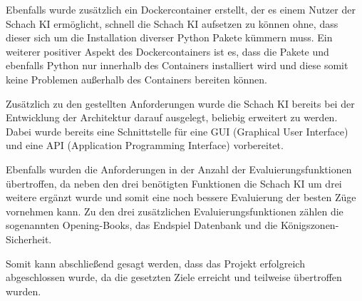 Ebenfalls wurde zusätzlich ein Dockercontainer erstellt, der es einem Nutzer der Schach KI ermöglicht, schnell die Schach KI aufsetzen zu können ohne, dass dieser sich um die Installation diverser Python Pakete kümmern muss. Ein weiterer positiver Aspekt des Dockercontainers ist es, dass die Pakete und ebenfalls Python nur innerhalb des Containers installiert wird und diese somit keine Problemen außerhalb des Containers bereiten können.

Zusätzlich zu den gestellten Anforderungen wurde die Schach KI bereits bei der Entwicklung der Architektur darauf ausgelegt, beliebig erweitert zu werden. Dabei wurde bereits eine Schnittstelle für eine \acs{GUI} (Graphical User Interface) und eine \acs{API} (Application Programming Interface) vorbereitet.

Ebenfalls wurden die Anforderungen in der Anzahl der Evaluierungsfunktionen übertroffen, da neben den drei benötigten Funktionen die Schach KI um drei weitere ergänzt wurde und somit eine noch bessere Evaluierung der besten Züge vornehmen kann. Zu den drei zusätzlichen Evaluierungsfunktionen zählen die sogenannten Opening-Books, das Endspiel Datenbank und die Königszonen-Sicherheit.

Somit kann abschließend gesagt werden, dass das Projekt erfolgreich abgeschlossen wurde, da die gesetzten Ziele erreicht und teilweise übertroffen wurden.

\iffalse


zusätzlich:
Dockerfile
Jupyter Notebook mit live compiling und Erklärungen
Aus 3 wurden 6 Evaluierungsfunktionen
History, Materialbewertung und attackierte Figuren
Vorbereitete Schnittstelle für GUI und API
Opening Book und Closing

2. Entwicklung einer KI für das Schach-Spiel

Das Schachspiel ist in der westlichen Welt das am weitesten verbreitete Brett-Spiel. Ziel der Studienarbeit
ist die Entwicklung eines Schachprogramms. Das wesentliche Ziel bei der Entwicklung dieses Programms
besteht darin, die Wirkungsweise der im Rahmen der KI-Vorlesung vorgestellten Algorithmen zu demonstrieren.
Insbesondere wird es wichtig sein, zur Evaluation einer Stellung eine gute Heuristik
zu entwickeln. Bei der Entwicklung dieser Heuristik sollen Techniken des Machine-Learnings eingesetzt
werden.

Anforderungen:
Keine hohe ELO Zahl
klarer/cleaner Code
Techniken aus Vorlesung erkennbar
Tagebuch führen
Regelmäßige Treffen
ASCII Ausgabe
Grundgerüst aufgesetzt
Einfacher Evaluierungsprozess
\fi

